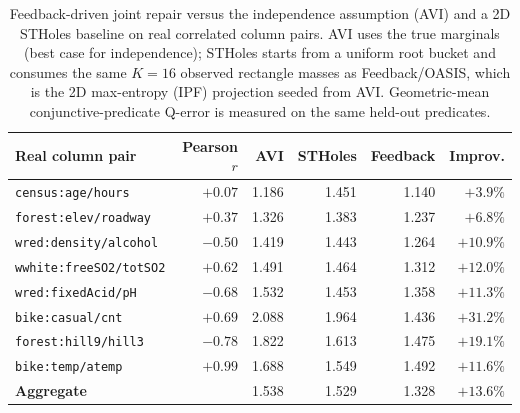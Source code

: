 \begin{table}[t]
  \centering\small
  \caption{Feedback-driven joint repair versus the independence assumption (AVI) and
  a 2D STHoles baseline on real correlated column pairs. AVI uses the true marginals
  (best case for independence); STHoles starts from a uniform root bucket and consumes
  the same $K{=}16$ observed rectangle masses as Feedback/OASIS, which is the 2D
  max-entropy (IPF) projection seeded from AVI. Geometric-mean conjunctive-predicate
  Q-error is measured on the same held-out predicates.}
  \label{tab:crosscol_feedback}
  \setlength{\tabcolsep}{6pt}
  \begin{tabular}{l r r r r r}
    \toprule
    Real column pair & Pearson $r$ & AVI & STHoles & Feedback & Improv. \\
    \midrule
    \texttt{census:age/hours} & $+0.07$ & 1.186 & 1.451 & 1.140 & $+3.9\%$ \\
    \texttt{forest:elev/roadway} & $+0.37$ & 1.326 & 1.383 & 1.237 & $+6.8\%$ \\
    \texttt{wred:density/alcohol} & $-0.50$ & 1.419 & 1.443 & 1.264 & $+10.9\%$ \\
    \texttt{wwhite:freeSO2/totSO2} & $+0.62$ & 1.491 & 1.464 & 1.312 & $+12.0\%$ \\
    \texttt{wred:fixedAcid/pH} & $-0.68$ & 1.532 & 1.453 & 1.358 & $+11.3\%$ \\
    \texttt{bike:casual/cnt} & $+0.69$ & 2.088 & 1.964 & 1.436 & $+31.2\%$ \\
    \texttt{forest:hill9/hill3} & $-0.78$ & 1.822 & 1.613 & 1.475 & $+19.1\%$ \\
    \texttt{bike:temp/atemp} & $+0.99$ & 1.688 & 1.549 & 1.492 & $+11.6\%$ \\
    \midrule
    \textbf{Aggregate} & & 1.538 & 1.529 & 1.328 & $+13.6\%$ \\
    \bottomrule
  \end{tabular}
\end{table}

